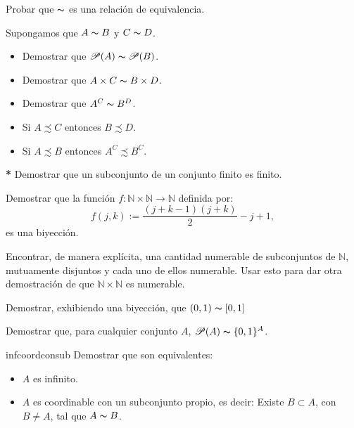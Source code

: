 \documentclass{book}
\newcommand{\nn}{\mathbb{N}}
\begin{document}
\begin{ejer}{1} Probar que $\thicksim$ es una
relación de equivalencia.
\end{ejer}

\begin{ejer}{1.2} Supongamos que $A\thicksim B$ y
$C\thicksim D$.
\begin{itemize}
\item[1.] Demostrar que $\mathscr{P}(A)\thicksim \mathscr{P}(B)$.
\item[2.] Demostrar que $A\times C\thicksim B\times D$.
\item[3.] Demostrar que $A^C\thicksim B^D$.
\item[4.] Si $A\precsim C$ entonces $B\precsim D$.
\item[5.] Si $A\precsim B$ entonces $A^C\precsim B^C$.

\end{itemize}
\end{ejer} 

\begin{ejer}{1.5} \textbf{*} Demostrar que un subconjunto de un conjunto
finito es finito.
\end{ejer}

\begin{ejer}{2} Demostrar que la función
$f:\nn\times\nn\longrightarrow\nn$ definida por:
\[f(j,k):=\frac{(j+k-1)(j+k)}{2}-j+1,\]
es una biyección.
\end{ejer}

\begin{ejer}{} Encontrar, de manera explícita, una cantidad numerable de subconjuntos
de $\nn$, mutuamente disjuntos y cada uno de ellos 
numerable. Usar esto para dar otra demostración de que $\nn\times\nn$ es
numerable.
\end{ejer}

\begin{ejer}{5} Demostrar, exhibiendo una biyección, que $(0,1)\thicksim [0,1]$
\end{ejer}



\begin{ejer}{8} Demostrar que, para cualquier conjunto
$A$, $\mathscr{P}(A)\thicksim\{0,1\}^A$.
\end{ejer}

\begin{ejer}{infcoordconsub} Demostrar que son
equivalentes:
\begin{itemize}
     \item[1.] $A$ es infinito.
     \item[2.] $A$ es coordinable con un subconjunto propio, es
     decir: Existe $B\subset A$, con $B\neq A$, tal que
     $A\thicksim B$.
\end{itemize}
\end{ejer}
\end{document}
